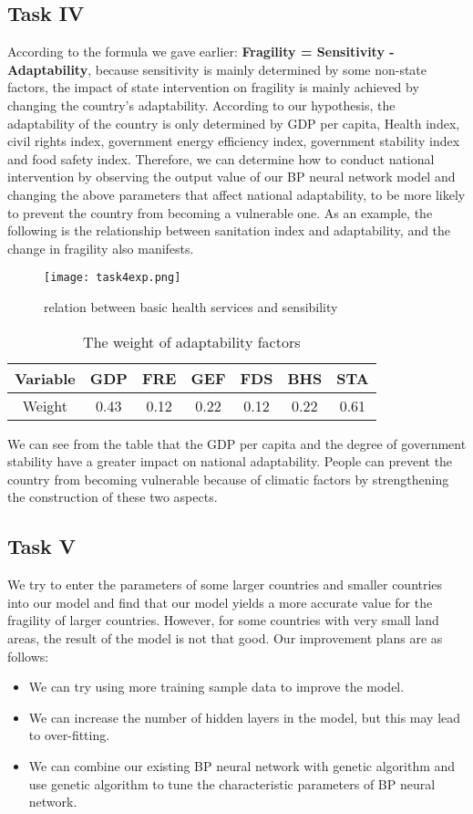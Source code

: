 \documentclass{mcmthesis}
\begin{document}
\subsection{Task IV}
According to the formula we gave earlier:
\textbf{Fragility = Sensitivity - Adaptability}, 
because sensitivity is mainly determined by some non-state 
factors, the impact of state intervention on fragility 
is mainly achieved by changing the country's adaptability. 
According to our hypothesis, the adaptability of the country 
is only determined by GDP per capita, Health index, civil 
rights index, government energy efficiency index, government 
stability index and food safety index. Therefore, we can 
determine how to conduct national intervention by observing 
the output value of our BP neural network model and changing 
the above parameters that affect national adaptability, to be 
more likely to prevent the country from becoming a vulnerable 
one. As an example, the following is the relationship between 
sanitation index and adaptability, and the change in fragility 
also manifests.
\newpage
\begin{figure}[htbp]
  \centering
  \texttt{[image: task4exp.png]}
  \caption{relation between basic health services and sensibility}
  \label{fig:sanitation}
\end{figure}
\begin{table}[h]
  \centering
  \begin{tabular} {|c|c|c|c|c|c|c|}  
  \hline  
  Variable & GDP & FRE & GEF & FDS & BHS & STA \\ \hline  
  Weight & 0.43 & 0.12 & 0.22 & 0.12 & 0.22 & 0.61  \\ \hline  
  \end{tabular}  
  \caption{The weight of adaptability factors}
\end{table}
We can see from the table that the GDP per capita and the 
degree of government stability have a greater impact on 
national adaptability. People can prevent the country from 
becoming vulnerable because of climatic factors by strengthening 
the construction of these two aspects.

\subsection{Task V}
We try to enter the parameters of some larger countries and 
smaller countries into our model and find that our model yields 
a more accurate value for the fragility of larger countries. 
However, for some countries with very small land areas, the 
result of the model is not that good. Our improvement plans 
are as follows:
\begin{itemize}
  \item We can try using more training sample data to improve the model.
  \item We can increase the number of hidden layers in the model, but 
  this may lead to over-fitting.
  \item We can combine our existing BP neural network with genetic 
  algorithm and use genetic algorithm to tune the characteristic 
  parameters of BP neural network.
\end{itemize}
\end{document}
